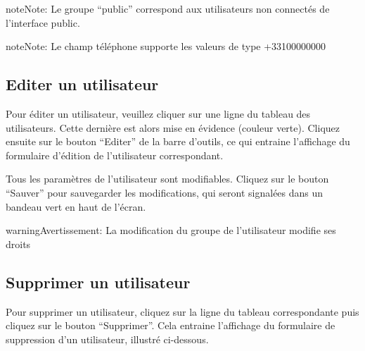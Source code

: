 \documentclass[letterpaper,10pt,french]{sphinxmanual}
\begin{document}
\begin{notice}{note}{Note:}
Le groupe ``public'' correspond aux utilisateurs non connectés de l'interface public.
\end{notice}

\begin{notice}{note}{Note:}
Le champ téléphone supporte les valeurs de type +33100000000
\end{notice}


\subsection{Editer un utilisateur}
\label{dashboard/usersmanagement:editer-un-utilisateur}
Pour éditer un utilisateur, veuillez cliquer sur une ligne du tableau
des utilisateurs. Cette dernière est alors mise en évidence (couleur
verte). Cliquez ensuite sur le bouton ``Editer'' de la barre d'outils,
ce qui entraine l'affichage du formulaire d'édition de l'utilisateur
correspondant.

Tous les paramètres de l'utilisateur sont modifiables. Cliquez sur le
bouton ``Sauver'' pour sauvegarder les modifications, qui seront
signalées dans un bandeau vert en haut de l'écran.


\begin{notice}{warning}{Avertissement:}
La modification du groupe de l'utilisateur modifie ses droits
\end{notice}


\subsection{Supprimer un utilisateur}
\label{dashboard/usersmanagement:supprimer-un-utilisateur}
Pour supprimer un utilisateur, cliquez sur la ligne du tableau
correspondante puis cliquez sur le bouton ``Supprimer''. Cela entraine
l'affichage du formulaire de suppression d'un utilisateur, illustré
ci-dessous.
\end{document}
